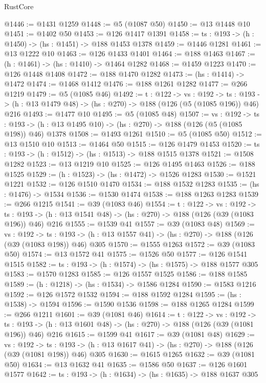 \begin{lexlean}{RustCore}
\begin{coremodule}
@1446 := @1431 @1259
@1448 := @5 (@1087 @50)
@1450 := @13 @1448 @10
@1451 := @1402 @50
@1453 := @126 @1417 @1391
@1458 := {ts : @193} -> (h : @1450) -> (hs : @1451) -> @188 @1453 @1378
@1459 := @1446 @1281
@1461 := @13 @1222 @10
@1463 := @126 @1433 @1401
@1464 := @188 @1463
@1467 := (h : @1461) -> (hs : @1410) -> @1464 @1282
@1468 := @1459 @1223
@1470 := @126 @1448 @1408
@1472 := @188 @1470 @1282
@1473 := (hs : @1414) -> @1472
@1474 := @1468 @1412
@1476 := @188 @1261 @1282
@1477 := @266 @1219
@1479 := @5 (@1085 @46)
@1492 := {t : @122} ->
  {vs : @192} ->
  {ts : @193} -> (h : @13 @1479 @48) -> (hs : @270) -> @188 (@126 (@5 (@1085 @196)) @46) @216
@1493 := @1477 @10
@1495 := @5 (@1085 @48)
@1507 := {vs : @192} ->
  {ts : @193} -> (h : @13 @1495 @10) -> (hs : @270) -> @188 (@126 (@5 (@1085 @198)) @46) @1378
@1508 := @1493 @1261
@1510 := @5 (@1085 @50)
@1512 := @13 @1510 @10
@1513 := @1464 @50
@1515 := @126 @1479 @1453
@1520 := {ts : @193} -> (h : @1512) -> (hs : @1513) -> @188 @1515 @1378
@1521 := @1508 @1282
@1523 := @13 @1219 @10
@1525 := @126 @1495 @1463
@1526 := @188 @1525
@1529 := (h : @1523) -> (hs : @1472) -> @1526 @1283
@1530 := @1521 @1221
@1532 := @126 @1510 @1470
@1534 := @188 @1532 @1283
@1535 := (hs : @1476) -> @1534
@1536 := @1530 @1474
@1538 := @188 @1263 @1283
@1539 := @266 @1215
@1541 := @39 (@1083 @46)
@1554 := {t : @122} ->
  {vs : @192} ->
  {ts : @193} -> (h : @13 @1541 @48) -> (hs : @270) -> @188 (@126 (@39 (@1083 @196)) @46) @216
@1555 := @1539 @41
@1557 := @39 (@1083 @48)
@1569 := {vs : @192} ->
  {ts : @193} -> (h : @13 @1557 @41) -> (hs : @270) -> @188 (@126 (@39 (@1083 @198)) @46) @305
@1570 := @1555 @1263
@1572 := @39 (@1083 @50)
@1574 := @13 @1572 @41
@1575 := @1526 @50
@1577 := @126 @1541 @1515
@1582 := {ts : @193} -> (h : @1574) -> (hs : @1575) -> @188 @1577 @305
@1583 := @1570 @1283
@1585 := @126 @1557 @1525
@1586 := @188 @1585
@1589 := (h : @1218) -> (hs : @1534) -> @1586 @1284
@1590 := @1583 @1216
@1592 := @126 @1572 @1532
@1594 := @188 @1592 @1284
@1595 := (hs : @1538) -> @1594
@1596 := @1590 @1536
@1598 := @188 @1265 @1284
@1599 := @266 @1211
@1601 := @39 (@1081 @46)
@1614 := {t : @122} ->
  {vs : @192} ->
  {ts : @193} -> (h : @13 @1601 @48) -> (hs : @270) -> @188 (@126 (@39 (@1081 @196)) @46) @216
@1615 := @1599 @41
@1617 := @39 (@1081 @48)
@1629 := {vs : @192} ->
  {ts : @193} -> (h : @13 @1617 @41) -> (hs : @270) -> @188 (@126 (@39 (@1081 @198)) @46) @305
@1630 := @1615 @1265
@1632 := @39 (@1081 @50)
@1634 := @13 @1632 @41
@1635 := @1586 @50
@1637 := @126 @1601 @1577
@1642 := {ts : @193} -> (h : @1634) -> (hs : @1635) -> @188 @1637 @305

\end{coremodule}
\end{lexlean}
